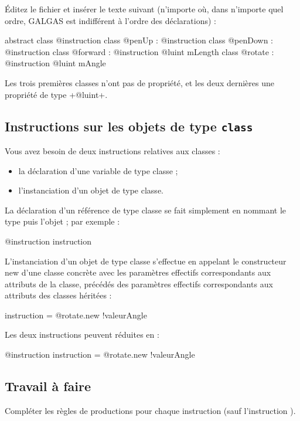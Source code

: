 Éditez le fichier  et insérer le texte suivant (n’importe où, dans n’importe quel ordre, GALGAS est indifférent à l’ordre des déclarations) :

\begin{galgas}
abstract class @instruction {
}
class @penUp : @instruction {
}
class @penDown : @instruction {
}
class @forward : @instruction {
  @luint mLength
}
class @rotate : @instruction {
  @luint mAngle
}
\end{galgas}


Les trois premières classes n'ont pas de propriété, et les deux dernières une propriété de type \ggs+@luint+.

\subsection{Instructions sur les objets de type \texttt{class}}

Vous avez besoin de deux instructions relatives aux classes :
\begin{itemize}
  \item la déclaration d'une variable de type classe ;
  \item l'instanciation d'un objet de type classe.
\end{itemize}

La déclaration d'un référence de type classe se fait simplement en nommant le type puis l'objet ; par exemple :
\begin{galgas}
@instruction instruction
\end{galgas}

L'instanciation d'un objet de type classe s'effectue en appelant le constructeur new d'une classe concrète avec les paramètres effectifs correspondants aux attributs de la classe, précédés des paramètres effectifs correspondants aux attributs des classes héritées :
\begin{galgas}
instruction = @rotate.new {!valeurAngle}
\end{galgas}

Les deux instructions peuvent réduites en :
\begin{galgas}
@instruction instruction = @rotate.new {!valeurAngle}
\end{galgas}

\subsection{Travail à faire}
Compléter les règles de productions pour chaque instruction (sauf l'instruction ).


